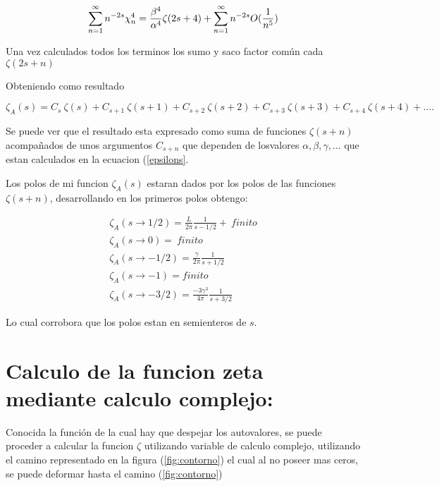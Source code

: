\begin{equation}
\sum _{n=1}  ^{\infty} n ^{-2s} \chi _n ^4 = \\
\frac{\beta ^4}{\alpha ^4} \zeta (2s+4) + 
\sum _{n=1} ^{\infty} n ^{-2s} O( \frac{1}{n ^5} )
\end{equation}



Una vez calculados todos los terminos los sumo y saco factor común cada $\zeta( 2s+n )$


Obteniendo como resultado 

\begin{equation}
    \zeta _A (s) = 
    C _s \ \zeta (s) +
    C _{s+1} \ \zeta (s+1) + 
    C _{s+2} \ \zeta (s+2) +
    C _{s+3} \ \zeta (s+3) + 
    C _{s+4} \ \zeta (s+4) + ....
\end{equation}

Se puede ver que el resultado esta expresado como suma de funciones $\zeta (s+n)$ acompañados de unos argumentos $C_{s+n}$ que dependen de losvalores $\alpha,\beta,\gamma, ...$ que estan calculados en la ecuacion (\ref{epsilons}.

Los polos de mi funcion $\zeta _A (s)$ estaran dados por los polos de las funciones $\zeta (s+n)$, desarrollando en los primeros polos obtengo:

\begin{equation}
\begin{array}{c}
\zeta _A (s \rightarrow 1/2) = 
\frac{L}{2 \pi } \frac{1}{s-1/2} + \ finito \\
\zeta _A (s \rightarrow 0) = \ finito \\
\zeta _A (s \rightarrow -1/2) = \frac{\gamma}{2 \pi} \frac{1}{s+1/2} \\
\zeta _A (s \rightarrow -1) = finito \\
\zeta _A (s \rightarrow -3/2) = \frac{-3 \gamma ^3}{4 \pi } \frac{1}{s+3/2}
\end{array}
\end{equation}

Lo cual corrobora que los polos estan en semienteros de $s$.

\section{Calculo de la funcion zeta mediante calculo complejo:}

Conocida la función de la cual hay que despejar los autovalores, se puede proceder a calcular la funcion $\zeta$ utilizando variable de calculo complejo, utilizando el camino representado en la figura (\ref{fig:contorno}) el cual al no poseer mas ceros, se puede deformar hasta el camino (\ref{fig:contorno}) 

